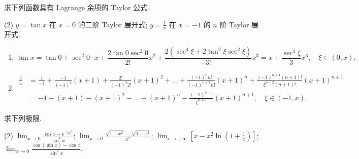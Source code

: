 \begin{exercise}[3.6.5]
    求下列函数具有 Lagrange 余项的 Taylor 公式.
    \begin{tasks}(2)
        \task $y = \tan x$ 在 $x = 0$ 的二阶 Taylor 展开式;
        \task $y = \frac{1}{x}$ 在 $x = -1$ 的 $n$ 阶 Taylor 展开式.
    \end{tasks}
\end{exercise}

\begin{solution}
    \begin{enumerate}
        \item $$\tan x = \tan 0 + \sec^2 0 \cdot x + \frac{2 \tan 0 \sec^2 0}{2!} x^2 + \frac{2(\sec^4 \xi + 2 \tan^2 \xi \sec^2 \xi)}{3!} x^3 = x + \frac{\sec^4 \xi}{3} x^3, \quad \xi \in (0, x).$$
        \item \begin{align*}
                  \frac{1}{x} & = \frac{1}{-1} + \frac{-1}{(-1)^2}(x + 1) + \frac{2!}{(-1)^3 2!}(x + 1)^2 + \dots + \frac{(-1)^n n!}{(-1)^{n+1} n!}(x + 1)^n + \frac{(-1)^{n+1} (n+1)!}{\xi^{n+2} (n+1)!}(x + 1)^{n+1} \\
                              & = -1 - (x + 1) - (x + 1)^2 - \dots - (x + 1)^n - \frac{(-1)^{n+1}}{\xi^{n+2}}(x + 1)^{n+1}, \quad \xi \in (-1, x).
              \end{align*}
    \end{enumerate}
\end{solution}

\begin{exercise}[3.6.6]
    求下列极限.
    \begin{tasks}(2)
        \task $\displaystyle \lim_{x \to 0} \frac{\cos x - \mathrm{e}^{-\frac{1}{2}x^2}}{\sin^4 x}$;
        \task $\displaystyle \lim_{x \to 0} \frac{\sqrt{1 + x^2} - \sqrt[3]{1 - x^2}}{x^2}$;
        \task $\displaystyle \lim_{x \to +\infty} \left[x - x^2 \ln \left(1 + \frac{1}{x}\right)\right]$;
        \task $\displaystyle \lim_{x \to 0} \frac{\cos(\sin x) - \cos x}{\sin^4 x}$.
    \end{tasks}
\end{exercise}

